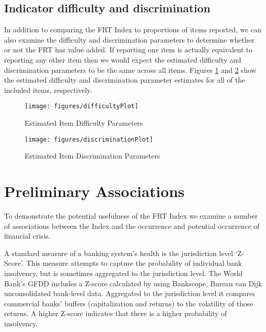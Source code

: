 \documentclass[a4paper]{article}
\begin{document}
{\subsection{Indicator difficulty and discrimination}

In addition to comparing the FRT Index to proportions of items reported, we can also examine the difficulty and discrimination parameters to determine whether or not the FRT has value added. If reporting one item is actually equivalent to reporting any other item then we would expect the estimated difficulty and discrimination parameters to be the same across all items. Figures \ref{DifficultyFig} and \ref{DiscrimFig} show the estimated difficulty and discrimination parameter estimates for all of the included items, respectively.


\begin{figure}
    \caption{Estimated Item Difficulty Parameters}
    \label{DifficultyFig}
    \begin{center}
        \texttt{[image: figures/difficultyPlot]}
    \end{center}
\end{figure}



\begin{figure}
    \caption{Estimated Item Discrimination Parameters}
    \label{DiscrimFig}
    \begin{center}
        \texttt{[image: figures/discriminationPlot]}
    \end{center}
\end{figure}


\section{Preliminary Associations}

To demonstrate the potential usefulness of the FRT Index we examine a number of associations between the Index and the occurrence and potential occurrence of financial crisis.


A standard measure of a banking system's health is the jurisdiction level `Z-Score'. This measure attempts to capture the probability of individual bank insolvency, but is sometimes aggregated to the jurisdiction level. The World Bank's GFDD includes a Z-score calculated by using Bankscope, Bureau van Dijk unconsolidated bank-level data. Aggregated to the jurisdiction level it compares commercial banks' buffers (capitalization and returns) to the volatility of those returns. A higher Z-score indicates that there is a higher probability of insolvency.

}
\end{document}
